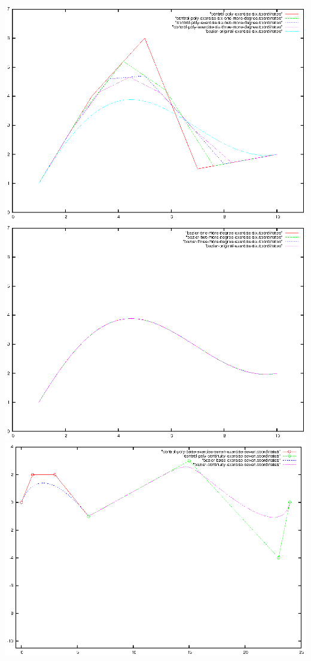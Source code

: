 \documentclass{article}
\begin{document}
\includegraphics{bezier-deCasteljau-curves/exercise-six-higher-degree-control-poly}
\includegraphics{bezier-deCasteljau-curves/exercise-six-one-more-degree-comparison}
\includegraphics{bezier-deCasteljau-curves/exercise-seven-continuity}
\end{document}
